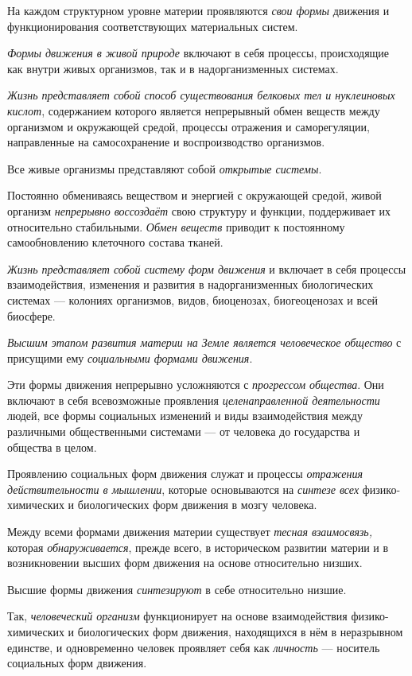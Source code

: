 \documentclass[a4paper,14pt,russian]{extreport}
\begin{document}
На каждом структурном уровне материи проявляются \emph{свои формы} движения и функционирования соответствующих материальных систем.

\emph{Формы движения в живой природе} включают в себя процессы, происходящие как внутри живых организмов, так и в надорганизменных системах.

\emph{Жизнь представляет собой способ существования белковых тел и нуклеиновых кислот}, содержанием которого является непрерывный обмен веществ между организмом и окружающей средой, процессы отражения и саморегуляции, направленные на самосохранение и воспроизводство организмов.

Все живые организмы представляют собой \emph{открытые системы}.

Постоянно обмениваясь веществом и энергией с окружающей средой, живой организм \emph{непрерывно воссоздаёт} свою структуру и функции, поддерживает их относительно стабильными. \emph{Обмен веществ} приводит к постоянному самообновлению клеточного состава тканей.

\emph{Жизнь представляет собой систему форм движения} и включает в себя процессы взаимодействия, изменения и развития в надорганизменных биологических системах --- колониях организмов, видов, биоценозах, биогеоценозах и всей биосфере.

\emph{Высшим этапом развития материи на Земле является человеческое общество} с присущими ему \emph{социальными формами движения}.

Эти формы движения непрерывно усложняются с \emph{прогрессом общества}. Они включают в себя всевозможные проявления \emph{целенаправленной деятельности} людей, все формы социальных изменений и виды взаимодействия между различными общественными системами --- от человека до государства и общества в целом.

Проявлению социальных форм движения служат и процессы \emph{отражения действительности в мышлении}, которые основываются на \emph{синтезе всех} физико-химических и биологических форм движения в мозгу человека.

Между всеми формами движения материи существует \emph{тесная взаимосвязь,} которая \emph{обнаруживается}, прежде всего, в историческом развитии материи и в возникновении высших форм движения на основе относительно низших.

Высшие формы движения \emph{синтезируют} в себе относительно низшие.

Так, \emph{человеческий организм} функционирует на основе взаимодействия физико-химических и биологических форм движения, находящихся в нём в неразрывном единстве, и одновременно человек проявляет себя как \emph{личность} --- носитель социальных форм движения.
\end{document}

